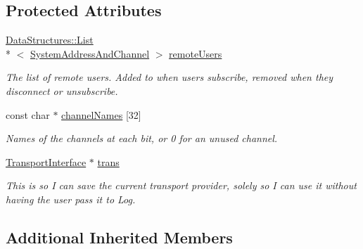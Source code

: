 \subsection*{Protected Attributes}
\begin{DoxyCompactItemize}
\item 
\hypertarget{class_rak_net_1_1_log_command_parser_a8ef3e9d5b4e224c326f6e67e90bd3be0}{\hyperlink{class_data_structures_1_1_list}{Data\-Structures\-::\-List}\\*
$<$ \hyperlink{struct_rak_net_1_1_log_command_parser_1_1_system_address_and_channel}{System\-Address\-And\-Channel} $>$ \hyperlink{class_rak_net_1_1_log_command_parser_a8ef3e9d5b4e224c326f6e67e90bd3be0}{remote\-Users}}\label{class_rak_net_1_1_log_command_parser_a8ef3e9d5b4e224c326f6e67e90bd3be0}

\begin{DoxyCompactList}\small\item\em The list of remote users. Added to when users subscribe, removed when they disconnect or unsubscribe. \end{DoxyCompactList}\item 
\hypertarget{class_rak_net_1_1_log_command_parser_abd8c4f014554fb2b8bf01cb1da0c953d}{const char $\ast$ \hyperlink{class_rak_net_1_1_log_command_parser_abd8c4f014554fb2b8bf01cb1da0c953d}{channel\-Names} \mbox{[}32\mbox{]}}\label{class_rak_net_1_1_log_command_parser_abd8c4f014554fb2b8bf01cb1da0c953d}

\begin{DoxyCompactList}\small\item\em Names of the channels at each bit, or 0 for an unused channel. \end{DoxyCompactList}\item 
\hypertarget{class_rak_net_1_1_log_command_parser_a5cbd401239fd22a2902eb75ba51dbbc4}{\hyperlink{class_rak_net_1_1_transport_interface}{Transport\-Interface} $\ast$ \hyperlink{class_rak_net_1_1_log_command_parser_a5cbd401239fd22a2902eb75ba51dbbc4}{trans}}\label{class_rak_net_1_1_log_command_parser_a5cbd401239fd22a2902eb75ba51dbbc4}

\begin{DoxyCompactList}\small\item\em This is so I can save the current transport provider, solely so I can use it without having the user pass it to Log. \end{DoxyCompactList}\end{DoxyCompactItemize}
\subsection*{Additional Inherited Members}


